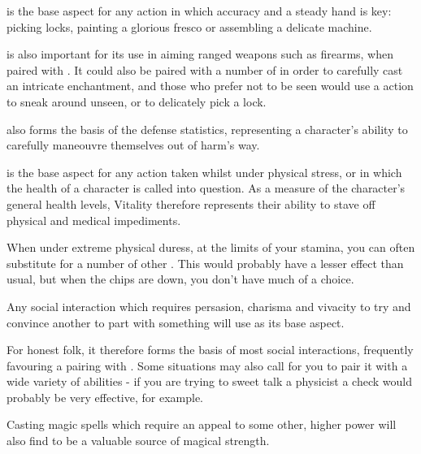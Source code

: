 
 is the base aspect for any action in which accuracy and a steady hand is key: picking locks, painting a glorious fresco or assembling a delicate machine. 

 is also important for its use in aiming ranged weapons such as firearms, when paired with . It could also be paired with a number of  in order to carefully cast an intricate enchantment, and those who prefer not to be seen would use a  action to sneak around unseen, or to delicately pick a lock. 

 also forms the basis of the  defense statistics, representing a character's ability to carefully maneouvre themselves out of harm's way.



 is the base aspect for any action taken whilst under physical stress, or in which the health of a character is called into question. As a measure of the character's general health levels, Vitality therefore represents their ability to stave off physical and medical impediments. 

When under extreme physical duress, at the limits of your stamina, you can often substitute  for a number of other . This would probably have a lesser effect than usual, but when the chips are down, you don't have much of a choice.  



Any social interaction which requires persasion, charisma and vivacity to try and convince another to part with something will use  as its base aspect. 

For honest folk, it therefore forms the basis of most social interactions, frequently favouring a pairing with . Some situations may also call for you to pair it with a wide variety of  abilities - if you are trying to sweet talk a physicist a  check would probably be very effective, for example.

Casting magic spells which require an appeal to some other, higher power will also find  to be a valuable source of magical strength. 



